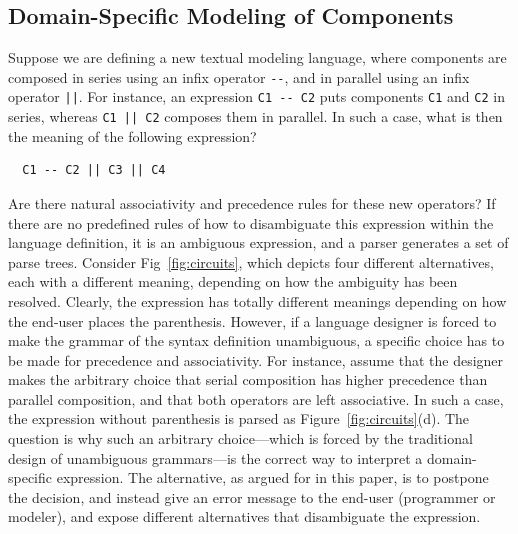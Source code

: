 \documentclass[acmsmall,review,anonymous]{acmart}\settopmatter{printfolios=true,printccs=false,printacmref=false}
\begin{document}
\subsection{Domain-Specific Modeling of Components}
Suppose we are defining a new textual modeling language, where components are composed in series using an infix operator \verb~--~, and in parallel using an infix operator \verb~||~. For instance, an expression \verb~C1 -- C2~ puts components \verb~C1~ and \verb~C2~ in series, whereas \verb~C1 || C2~ composes them in parallel. In such a case, what is then the meaning of the following expression?
\begin{verbatim}
  C1 -- C2 || C3 || C4
\end{verbatim}

\noindent Are there natural associativity and precedence rules for these new operators? If there are no predefined rules of how to disambiguate this expression within the language definition, it is an ambiguous expression, and a parser generates a set of parse trees. Consider Fig~\ref{fig:circuits}, which depicts four different alternatives, each with a different meaning, depending on how the ambiguity has been resolved. Clearly, the expression has totally different meanings depending on how the end-user places the parenthesis. However, if a language designer is forced to make the grammar of the syntax definition unambiguous, a specific choice has to be made for precedence and associativity. For instance, assume that the designer makes the arbitrary choice that serial composition has higher precedence than parallel composition, and that both operators are left associative. In such a case, the expression without parenthesis is parsed as Figure~\ref{fig:circuits}(d). The question is why such an arbitrary choice---which is forced by the traditional design of unambiguous grammars---is the correct way to interpret a domain-specific expression. The alternative, as argued for in this paper, is to postpone the decision, and instead give an error message to the end-user (programmer or modeler), and expose different alternatives that disambiguate the expression.
\end{document}
